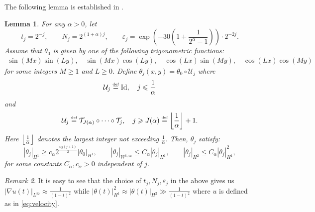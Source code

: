 \documentclass[12pt]{report}   %
\newcommand{\defeq}{\stackrel{\scriptscriptstyle\textup{def}}{=}}
\renewcommand{\le}{\leqslant}
\renewcommand{\ge}{\geqslant}
\numberwithin{equation}{section}
\theoremstyle{plain}
\newtheorem{lemma}{Lemma}[section]
\theoremstyle{definition}
\theoremstyle{remark}
\newtheorem{remark}[lemma]{Remark}
\newcommand{\eps}{{\varepsilon}}
\begin{document}
The following lemma is established in \cite{DrivasElgindiEA22}.
\begin{lemma}\label{thm:inviscid-bounds} 
For any $\alpha >0$, let \[t_j=2^{-j},\qquad N_j=2^{{(1+\alpha)}j},\qquad \eps_j={\exp\left(-30(1 + \frac{1}{2^\alpha-1})\right)}\cdot 2^{-2j}.\] {Assume that $\theta_0$ is given by one of the following trigonometric functions: \begin{equation*}
	\begin{split}
	\sin(Mx)\sin(Ly),\quad \sin(Mx)\cos(Ly),\quad\cos(Lx)\sin(My),\quad \cos(Lx)\cos(My)
	\end{split}
	\end{equation*} for some integers $M\ge1$ and $L\ge 0$. Define $\theta_j(x,y)=\theta_0\circ \mathcal{U}_j$ where}\begin{equation*}
\begin{split}
\mathcal{U}_j \defeq \mathrm{Id}, \quad j \le \frac{1}{\alpha} 
\end{split}
\end{equation*} and \begin{equation*}
\begin{split}
\mathcal{U}_j \defeq \mathcal{T}_{J(\alpha)} \circ \cdots \circ \mathcal{T}_j, \quad j \ge J(\alpha)\defeq \left\lfloor \frac{1}{\alpha} \right\rfloor + 1 . 
\end{split}
\end{equation*} Here $\left\lfloor \frac{1}{\alpha} \right \rfloor$ denotes the largest integer not exceeding $\frac{1}{\alpha}$.  Then, $\theta_j$ satisfy:
\[|\theta _j|_{H^1}\ge {c_\alpha} 2^{\frac{{\alpha}j(j+1)}{2}}{|\theta_0|_{H^1}} ,\qquad |\theta _j|_{W^{1,\infty}}\le {C_\alpha} |\theta _j|_{H^1}, \qquad |\theta _j|_{H^2}\le {C_\alpha}|\theta _j|_{H^1}^2,\] for some constants $C_\alpha,c_\alpha>0$ independent of $j$. \end{lemma}


\begin{remark}
It is easy to see that the choice of $t_j, N_j, \eps_j$ in the above gives us $|\nabla u (t)|_{L^\infty} \approx \frac{1}{(1-t)^2}$ while $|\theta (t)|_{H^1}^2\approx |\theta (t)|_{H^{{2}}}\gg \frac{1}{(1-t)^2}$ where $u$ is defined as in \eqref{eq:velocity}. 
\end{remark}
\end{document}
